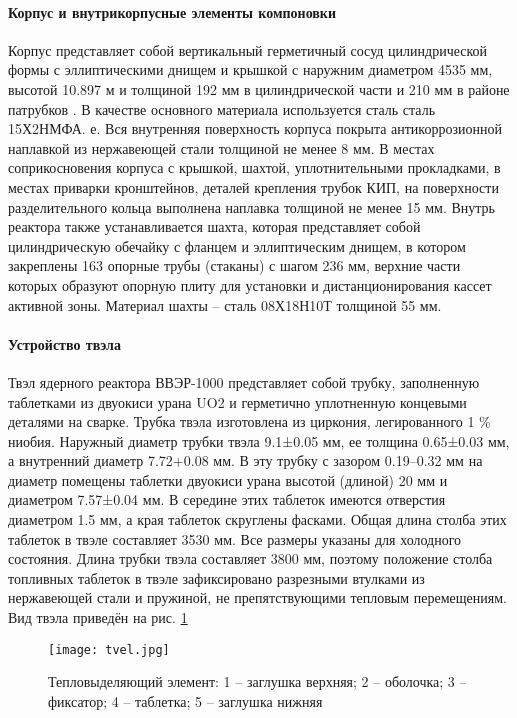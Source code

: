 \paragraph{Корпус и внутрикорпусные элементы компоновки} Корпус представляет собой вертикальный герметичный сосуд
цилиндрической формы с эллиптическими днищем и крышкой  с наружним диаметром 4535 мм, высотой 10.897 м и толщиной 192 мм в цилиндрической части и 210 мм в районе патрубков \cite{лескин2011физические}. В качестве основного материала используется сталь сталь 15Х2НМФА. е. Вся внутренняя поверхность корпуса покрыта
антикоррозионной наплавкой из нержавеющей стали толщиной не
менее 8 мм. В местах соприкосновения корпуса с крышкой, шахтой, уплотнительными прокладками, в местах приварки
кронштейнов, деталей крепления трубок КИП, на поверхности разделительного кольца выполнена наплавка толщиной не менее
15 мм. Внутрь реактора также устанавливается шахта, которая  представляет собой цилиндрическую обечайку с фланцем и эллиптическим днищем, в котором закреплены 163 опорные
трубы (стаканы) с шагом 236 мм, верхние части которых образуют
опорную плиту для установки и дистанционирования кассет активной зоны. Материал шахты – сталь 08Х18Н10Т толщиной 55 мм.

\paragraph{Устройство твэла} Твэл ядерного реактора ВВЭР-1000 представляет собой трубку, заполненную таблетками из двуокиси урана UO2 и герметично уплотненную концевыми деталями на сварке. Трубка твэла изготовлена из циркония, легированного 1 \% ниобия. Наружный диаметр трубки твэла 9.1±0.05 мм, ее толщина 0.65±0.03 мм, а внутренний диаметр 7.72+0.08 мм.
В эту трубку с зазором 0.19–0.32 мм на диаметр помещены таблетки двуокиси урана высотой (длиной) 20 мм и диаметром 7.57±0.04 мм. В середине этих таблеток имеются отверстия диаметром 1.5 мм, а края таблеток скруглены фасками. Общая длина столба этих таблеток в твэле составляет 3530 мм. Все размеры указаны для холодного состояния. Длина трубки твэла составляет 3800 мм, поэтому положение столба топливных таблеток в твэле зафиксировано разрезными втулками из нержавеющей стали и пружиной, не препятствующими тепловым перемещениям. Вид твэла приведён на рис. \ref{pic:tvel} \cite{ТвэлТерновых}

\begin{figure}[H]
    \begin{center}
        \texttt{[image: tvel.jpg]}
        \caption{
                Тепловыделяющий элемент: 1 – заглушка верхняя; 2 – оболочка; 3 – фиксатор; 4 – таблетка; 5 – заглушка нижняя
        }
        \label{pic:tvel}
    \end{center}
\end{figure}

